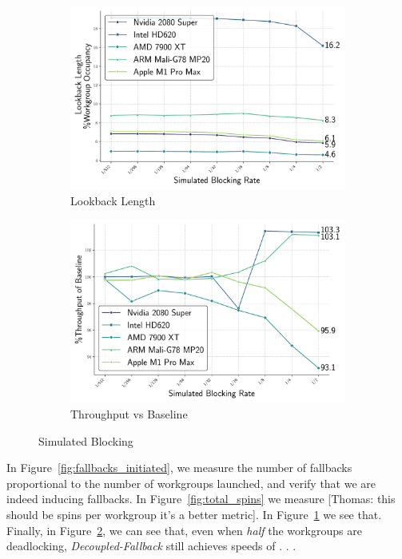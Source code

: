 \documentclass[sigconf]{acmart}
\newcommand{\thomas}[1]{{\footnotesize\color{orange}[Thomas: #1]}}
\begin{document}
\begin{figure}[t]
  \begin{subfigure}[t]{0.48\linewidth}
    \centering
    \includegraphics[width=\linewidth]{graphics/lookbackLength_plot.pdf}
    \caption{Lookback Length}
    \label{fig:lookback_length}
  \end{subfigure}\hfill
  \begin{subfigure}[t]{0.48\linewidth}
    \centering
    \includegraphics[width=\linewidth]{graphics/time_plot.pdf}
    \caption{Throughput vs Baseline}
    \label{fig:execution_time}
  \end{subfigure}

  \caption{Simulated Blocking}
  \label{fig:vertical_images}
\end{figure}

In Figure~\ref{fig:fallbacks_initiated}, we measure the number of fallbacks proportional to the number of workgroups launched, and verify that we are indeed inducing fallbacks. In Figure~\ref{fig:total_spins} we measure \thomas{this should be spins per workgroup it's a better metric}. In Figure~\ref{fig:lookback_length} we see that. Finally, in Figure~\ref{fig:execution_time}, we can see that, even when \emph{half} the workgroups are deadlocking, \emph{Decoupled-Fallback} still achieves speeds of . . .
\end{document}
